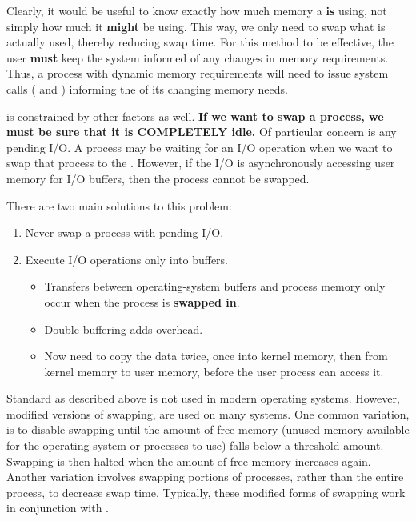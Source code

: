 Clearly, it would be useful to know exactly how much memory a   \textbf{is} using, not simply how much it \textbf{might} be using.
This way, we only need to swap what is actually used, thereby reducing swap time.
For this method to be effective, the user \textbf{must} keep the system informed of any changes in memory requirements.
Thus, a process with dynamic memory requirements will need to issue system calls ( and ) informing the  of its changing memory needs.

 is constrained by other factors as well.
\textbf{If we want to swap a process, we must be sure that it is COMPLETELY idle.}
Of particular concern is any pending I/O.
A process may be waiting for an I/O operation when we want to swap that process to the .
However, if the I/O is asynchronously accessing user memory for I/O buffers, then the process cannot be swapped.

There are two main solutions to this problem:
\begin{enumerate}[noitemsep]
\item Never swap a process with pending I/O.
\item Execute I/O operations only into  buffers.
  \begin{itemize}[noitemsep]
  \item Transfers between operating-system buffers and process memory only occur when the process is \textbf{swapped in}.
  \item Double buffering adds overhead.
  \item Now need to copy the data twice, once into kernel memory, then from kernel memory to user memory, before the user process can access it.
  \end{itemize}
\end{enumerate}

Standard  as described above is not used in modern operating systems.
However, modified versions of swapping, are used on many systems.
One common variation, is to disable swapping until the amount of free memory (unused memory available for the operating system or processes to use) falls below a threshold amount.
Swapping is then halted when the amount of free memory increases again.
Another variation involves swapping portions of processes, rather than the entire process, to decrease swap time.
Typically, these modified forms of swapping work in conjunction with .

